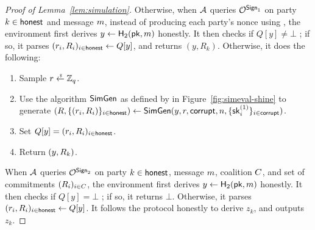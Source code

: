 \begin{proof}[Proof of Lemma~\ref{lem:simulation}]
  Otherwise, when $\mathcal{A}$ queries $\mathcal{O}^{\mathsf{Sign}_1}$ on party $k \in \mathsf{honest}$ and message $m$,
  instead of producing each party's nonce using \DVRFOne,
  the environment first derives $y \gets \mathsf{H}_2(\mathsf{pk}, m)$ honestly.
  It then checks if  $Q[y] \neq \bot$ ;
  if so,
  it parses $(r_i, R_i)_{i \in \mathsf{honest}} \gets Q[y]$,
  and returns $(y, R_k)$.
  Otherwise,
  it does the following:
  \begin{enumerate}
    \item Sample $r \rgets \Zq$.
    \item Use the algorithm $\mathsf{SimGen}$ as defined by \DVRFOne in Figure~\ref{fig:simeval-shine} to generate
      $(R, \{ (r_i, \allowbreak R_i)\}_{i \in \mathsf{honest}} ) \allowbreak \gets \mathsf{SimGen}(y, r, \allowbreak \mathsf{corrupt}, n,  \{\mathsf{sk}^{(1)}_i\}_{i \in \mathsf{corrupt}})$.
    \item Set $Q[y] = (r_i, R_i)_{i \in \mathsf{honest}}$.
    \item Return $(y, R_k)$.
  \end{enumerate}

  When $\mathcal{A}$ queries $\mathcal{O}^{\mathsf{Sign}_2}$ on party $k \in \mathsf{honest}$,
  message $m$, coalition $C$, and set of commitments $(R_i)_{i \in C}$,
  the environment first derives $y \gets \mathsf{H}_2(\mathsf{pk}, m)$ honestly.
  It then checks if  $Q[y] = \bot$ ;
  if so,
  it returns $\bot$.
  Otherwise,
  it parses $(r_i, R_i)_{i \in \mathsf{honest}} \gets Q[y]$.
  It follows the protocol honestly to derive $z_k$,
  and outputs $z_k$.

%
%
%
%


\end{proof}
